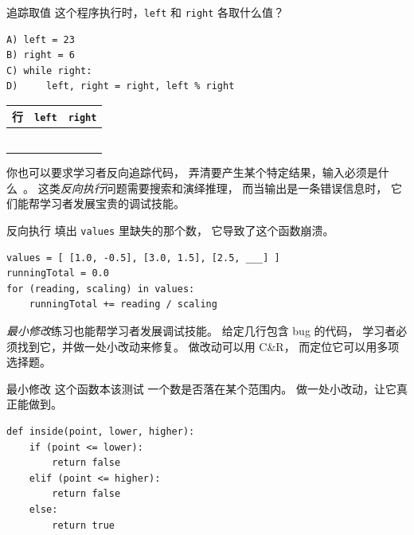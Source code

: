 \newpage
\begin{aside}{追踪取值}
  这个程序执行时，\texttt{left} 和 \texttt{right} 各取什么值？

\begin{verbatim}
A) left = 23
B) right = 6
C) while right:
D)     left, right = right, left % right
\end{verbatim}
\end{aside}

\begin{center}
\begin{tabular}{|l|l|l|}
  \hline
  行 & \texttt{left} & \texttt{right} \\
  \hline
  & & \\
  \hline
  & & \\
  \hline
  & & \\
  \hline
  & & \\
  \hline
  & & \\
  \hline
  & & \\
  \hline
\end{tabular}
\end{center}

你也可以要求学习者反向追踪代码，
弄清要产生某个特定结果，输入必须是什么~\cite{Armo2008}。
这类\emph{反向执行}问题需要搜索和演绎推理，
而当输出是一条错误信息时，
它们能帮学习者发展宝贵的调试技能。

\begin{aside}{反向执行}
  填出 \texttt{values} 里缺失的那个数，
  它导致了这个函数崩溃。

\begin{verbatim}
values = [ [1.0, -0.5], [3.0, 1.5], [2.5, ___] ]
runningTotal = 0.0
for (reading, scaling) in values:
    runningTotal += reading / scaling
\end{verbatim}
\end{aside}

\emph{最小修改}练习也能帮学习者发展调试技能。
给定几行包含 bug 的代码，
学习者必须找到它，并做一处小改动来修复。
做改动可以用 C\&R，
而定位它可以用多项选择题。

\begin{aside}{最小修改}
  这个函数本该测试
  一个数是否落在某个范围内。
  做一处小改动，让它真正能做到。

\begin{verbatim}
def inside(point, lower, higher):
    if (point <= lower):
        return false
    elif (point <= higher):
        return false
    else:
        return true
\end{verbatim}
\end{aside}

